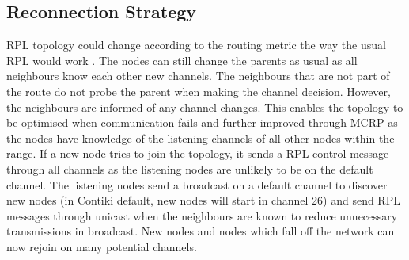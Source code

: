 \subsection{Reconnection Strategy}

RPL topology could change according to the routing metric \cite{routingmetrics} the way the usual RPL would work \cite{winter2012rpl}. The nodes can still change the parents as usual as all neighbours know each other new channels. The neighbours that are not part of the route do not probe the parent when making the channel decision. However, the neighbours are informed of any channel changes.
This enables the topology to be optimised when communication fails and further improved through MCRP as the nodes have knowledge of the listening channels of all other nodes within the range. If a new node tries to join the topology, it sends a RPL control message through all channels as the listening nodes are unlikely to be on the default channel. The listening nodes send a broadcast on a default channel to discover new nodes (in Contiki default, new nodes will start in channel 26) and send RPL messages through unicast when the neighbours are known to reduce unnecessary transmissions in broadcast. New nodes and nodes which fall off the network can now rejoin on many potential channels.
